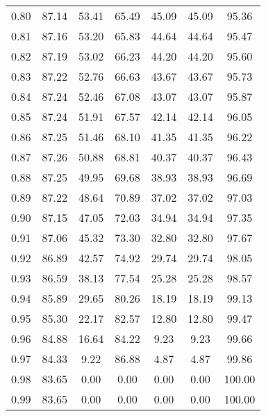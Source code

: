 \begin{tabular}{|c|c|c|c|c|c|c|}
      0.80 &     87.14 &     53.41 &      65.49 &   45.09 &      45.09 &         95.36 \\
      0.81 &     87.16 &     53.20 &      65.83 &   44.64 &      44.64 &         95.47 \\
      0.82 &     87.19 &     53.02 &      66.23 &   44.20 &      44.20 &         95.60 \\
      0.83 &     87.22 &     52.76 &      66.63 &   43.67 &      43.67 &         95.73 \\
      0.84 &     87.24 &     52.46 &      67.08 &   43.07 &      43.07 &         95.87 \\
      0.85 &     87.24 &     51.91 &      67.57 &   42.14 &      42.14 &         96.05 \\
      0.86 &     87.25 &     51.46 &      68.10 &   41.35 &      41.35 &         96.22 \\
      0.87 &     87.26 &     50.88 &      68.81 &   40.37 &      40.37 &         96.43 \\
      0.88 &     87.25 &     49.95 &      69.68 &   38.93 &      38.93 &         96.69 \\
      0.89 &     87.22 &     48.64 &      70.89 &   37.02 &      37.02 &         97.03 \\
      0.90 &     87.15 &     47.05 &      72.03 &   34.94 &      34.94 &         97.35 \\
      0.91 &     87.06 &     45.32 &      73.30 &   32.80 &      32.80 &         97.67 \\
      0.92 &     86.89 &     42.57 &      74.92 &   29.74 &      29.74 &         98.05 \\
      0.93 &     86.59 &     38.13 &      77.54 &   25.28 &      25.28 &         98.57 \\
      0.94 &     85.89 &     29.65 &      80.26 &   18.19 &      18.19 &         99.13 \\
      0.95 &     85.30 &     22.17 &      82.57 &   12.80 &      12.80 &         99.47 \\
      0.96 &     84.88 &     16.64 &      84.22 &    9.23 &       9.23 &         99.66 \\
      0.97 &     84.33 &      9.22 &      86.88 &    4.87 &       4.87 &         99.86 \\
      0.98 &     83.65 &      0.00 &       0.00 &    0.00 &       0.00 &        100.00 \\
      0.99 &     83.65 &      0.00 &       0.00 &    0.00 &       0.00 &        100.00 \\
\bottomrule
\end{tabular}

